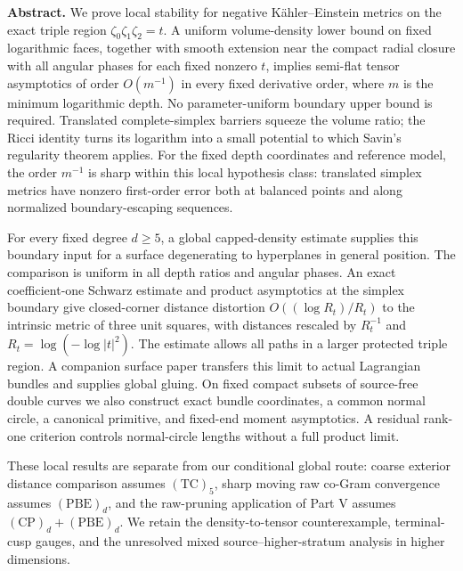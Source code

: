 \documentclass[a4paper,11pt]{ltjsarticle}
\numberwithin{equation}{section}
\theoremstyle{plain}
\theoremstyle{definition}
\theoremstyle{remark}
\begin{document}
\begin{center}
\begin{minipage}{0.93\textwidth}\small
\textbf{Abstract.}
We prove local stability for negative Kähler--Einstein metrics on the exact triple region
$\zeta_0\zeta_1\zeta_2=t$. A uniform volume-density lower bound on fixed logarithmic faces,
together with smooth extension near the compact radial closure with all angular phases for each fixed nonzero $t$,
implies semi-flat tensor asymptotics of order $O(m^{-1})$ in every fixed derivative order,
where $m$ is the minimum logarithmic depth. No parameter-uniform boundary upper bound is required.
Translated complete-simplex barriers squeeze the volume ratio; the Ricci identity turns its logarithm
into a small potential to which Savin's regularity theorem applies.
For the fixed depth coordinates and reference model, the order $m^{-1}$ is sharp
within this local hypothesis class: translated simplex metrics have nonzero
first-order error both at balanced points and along normalized boundary-escaping sequences.

For every fixed degree $d\ge5$, a global capped-density estimate supplies this boundary input
for a surface degenerating to hyperplanes in general position. The comparison is uniform in all depth ratios and angular phases.
An exact coefficient-one Schwarz estimate and product asymptotics at the simplex boundary give
closed-corner distance distortion $O((\log R_t)/R_t)$ to the intrinsic metric of three unit squares,
with distances rescaled by $R_t^{-1}$ and $R_t=\log(-\log|t|^2)$.
The estimate allows all paths in a larger protected triple region.
A companion surface paper transfers this limit to actual Lagrangian bundles and supplies global gluing.
On fixed compact subsets of source-free double curves we also construct exact bundle coordinates,
a common normal circle, a canonical primitive, and fixed-end moment asymptotics.
A residual rank-one criterion controls normal-circle lengths without a full product limit.

These local results are separate from our conditional global route:
coarse exterior distance comparison assumes $\mathrm{(TC)}_5$,
sharp moving raw co-Gram convergence assumes $\mathrm{(PBE)}_d$,
and the raw-pruning application of Part V assumes $\mathrm{(CP)}_d+\mathrm{(PBE)}_d$.
We retain the density-to-tensor counterexample, terminal-cusp gauges,
and the unresolved mixed source--higher-stratum analysis in higher dimensions.
\end{minipage}
\end{center}
\end{document}
